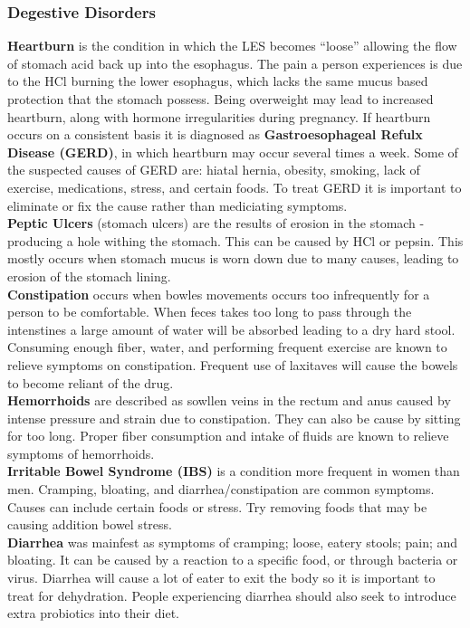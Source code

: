 \documentclass[letterpaper, 11pt]{article}
\begin{document}
\subsubsection{Degestive Disorders}
\label{sec:org4fcbebb}
\textbf{Heartburn} is the condition in which the LES becomes ``loose'' allowing the flow of stomach acid back up into the esophagus. The pain a person experiences is due to the HCl burning the lower esophagus, which lacks the same mucus based protection that the stomach possess. Being overweight may lead to increased heartburn, along with hormone irregularities during pregnancy. If heartburn occurs on a consistent basis it is diagnosed as \textbf{Gastroesophageal Refulx Disease (GERD)}, in which heartburn may occur several times a week. Some of the suspected causes of GERD are: hiatal hernia, obesity, smoking, lack of exercise, medications, stress, and certain foods. To treat GERD it is important to eliminate or fix the cause rather than mediciating symptoms.\\
\textbf{Peptic Ulcers} (stomach ulcers) are the results of erosion in the stomach - producing a hole withing the stomach. This can be caused by HCl or pepsin. This mostly occurs when stomach mucus is worn down due to many causes, leading to erosion of the stomach lining.\\
\textbf{Constipation} occurs when bowles movements occurs too infrequently for a person to be comfortable. When feces takes too long to pass through the intenstines a large amount of water will be absorbed leading to a dry hard stool. Consuming enough fiber, water, and performing frequent exercise are known to relieve symptoms on constipation. Frequent use of laxitaves will cause the bowels to become reliant of the drug.\\
\textbf{Hemorrhoids} are described as sowllen veins in the rectum and anus caused by intense pressure and strain due to constipation. They can also be cause by sitting for too long. Proper fiber consumption and intake of fluids are known to relieve symptoms of hemorrhoids.\\
\textbf{Irritable Bowel Syndrome (IBS)} is a condition more frequent in women than men. Cramping, bloating, and diarrhea/constipation are common symptoms. Causes can include certain foods or stress. Try removing foods that may be causing addition bowel stress.\\
\textbf{Diarrhea} was mainfest as symptoms of cramping; loose, eatery stools; pain; and bloating. It can be caused by a reaction to a specific food, or through bacteria or virus. Diarrhea will cause a lot of eater to exit the body so it is important to treat for dehydration. People experiencing diarrhea should also seek to introduce extra probiotics into their diet.\\
\end{document}
